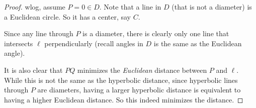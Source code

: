 \documentclass[a4paper]{article}
\begin{document}
\begin{proof}
  wlog, assume $P = 0 \in D$. Note that a line in $D$ (that is not a diameter) is a Euclidean circle. So it has a center, say $C$.

  Since any line through $P$ is a diameter, there is clearly only one line that intersects $\ell$ perpendicularly (recall angles in $D$ is the same as the Euclidean angle).
  \begin{center}
  \end{center}
  It is also clear that $PQ$ minimizes the \emph{Euclidean} distance between $P$ and $\ell$. While this is not the same as the hyperbolic distance, since hyperbolic lines through $P$ are diameters, having a larger hyperbolic distance is equivalent to having a higher Euclidean distance. So this indeed minimizes the distance.
\end{proof}
\end{document}
